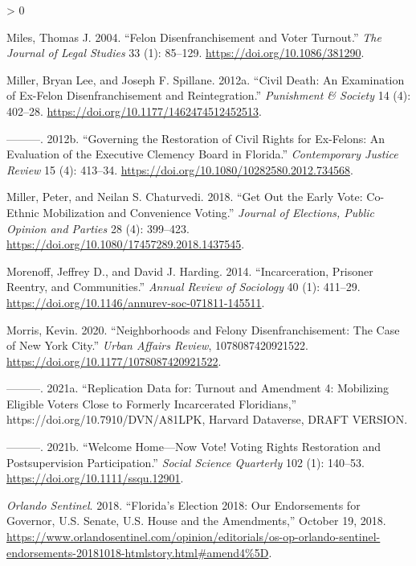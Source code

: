 \documentclass[
  12pt,
]{article}
\newlength{\cslhangindent}
\newenvironment{CSLReferences}[2] %
 {%
  \setlength{\parindent}{0pt}
  \ifodd #1 \everypar{\setlength{\hangindent}{\cslhangindent}}\ignorespaces\fi
  \ifnum #2 > 0
  \setlength{\parskip}{#2\baselineskip}
  \fi
 }%
 {}
\begin{document}
\begin{CSLReferences}{1}{0}
\leavevmode\hypertarget{ref-Miles2004}{}%
Miles, Thomas J. 2004. {``Felon {Disenfranchisement} and {Voter Turnout}.''} \emph{The Journal of Legal Studies} 33 (1): 85--129. \url{https://doi.org/10.1086/381290}.

\leavevmode\hypertarget{ref-Miller2012}{}%
Miller, Bryan Lee, and Joseph F. Spillane. 2012a. {``Civil Death: {An} Examination of Ex-Felon Disenfranchisement and Reintegration.''} \emph{Punishment \& Society} 14 (4): 402--28. \url{https://doi.org/10.1177/1462474512452513}.

\leavevmode\hypertarget{ref-Miller2012a}{}%
---------. 2012b. {``Governing the Restoration of Civil Rights for Ex-Felons: An Evaluation of the {Executive Clemency Board} in {Florida}.''} \emph{Contemporary Justice Review} 15 (4): 413--34. \url{https://doi.org/10.1080/10282580.2012.734568}.

\leavevmode\hypertarget{ref-Miller2018}{}%
Miller, Peter, and Neilan S. Chaturvedi. 2018. {``Get Out the Early Vote: Co-Ethnic Mobilization and Convenience Voting.''} \emph{Journal of Elections, Public Opinion and Parties} 28 (4): 399--423. \url{https://doi.org/10.1080/17457289.2018.1437545}.

\leavevmode\hypertarget{ref-Morenoff2014}{}%
Morenoff, Jeffrey D., and David J. Harding. 2014. {``Incarceration, {Prisoner Reentry}, and {Communities}.''} \emph{Annual Review of Sociology} 40 (1): 411--29. \url{https://doi.org/10.1146/annurev-soc-071811-145511}.

\leavevmode\hypertarget{ref-Morris2020}{}%
Morris, Kevin. 2020. {``Neighborhoods and {Felony Disenfranchisement}: {The Case} of {New York City}.''} \emph{Urban Affairs Review}, 1078087420921522. \url{https://doi.org/10.1177/1078087420921522}.

\leavevmode\hypertarget{ref-Morris2021a}{}%
---------. 2021a. ``Replication Data for: Turnout and Amendment 4: Mobilizing Eligible Voters Close to Formerly Incarcerated Floridians,'' https://doi.org/10.7910/DVN/A81LPK, Harvard Dataverse, DRAFT VERSION.

\leavevmode\hypertarget{ref-Morris2021}{}%
---------. 2021b. {``Welcome {Home}---{Now Vote}! {Voting Rights Restoration} and {Postsupervision Participation}.''} \emph{Social Science Quarterly} 102 (1): 140--53. \url{https://doi.org/10.1111/ssqu.12901}.

\leavevmode\hypertarget{ref-ORLANDOSENTINEL2018}{}%
\emph{Orlando Sentinel}. 2018. {``Florida's {Election} 2018: {Our} Endorsements for Governor, {U}.{S}. {Senate}, {U}.{S}. {House} and the Amendments,''} October 19, 2018. \url{https://www.orlandosentinel.com/opinion/editorials/os-op-orlando-sentinel-endorsements-20181018-htmlstory.html\#amend4\%5D}.


\end{CSLReferences}
\end{document}
